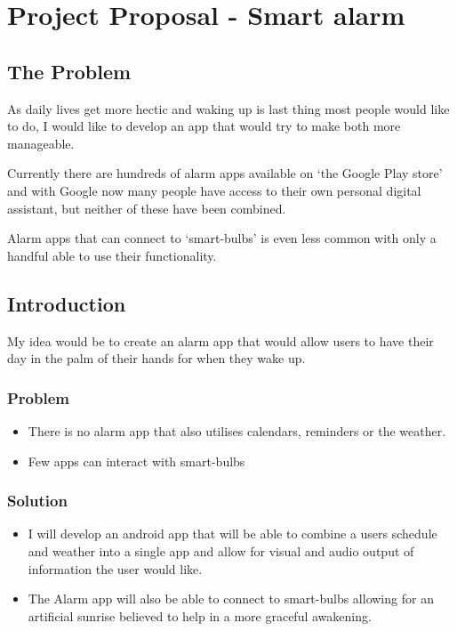 \section{Project Proposal - Smart
alarm}\label{project-proposal---smart-alarm}

\subsection{The Problem}\label{the-problem}

As daily lives get more hectic and waking up is last thing most people
would like to do, I would like to develop an app that would try to make
both more manageable.

Currently there are hundreds of alarm apps available on `the Google Play
store' and with Google now many people have access to their own personal
digital assistant, but neither of these have been combined.

Alarm apps that can connect to `smart-bulbs' is even less common with
only a handful able to use their functionality.

\subsection{Introduction}\label{introduction}

My idea would be to create an alarm app that would allow users to have
their day in the palm of their hands for when they wake up.

\subsubsection{Problem}\label{problem}

\begin{itemize}
\item
  There is no alarm app that also utilises calendars, reminders or the
  weather.
\item
  Few apps can interact with smart-bulbs
\end{itemize}

\subsubsection{Solution}\label{solution}

\begin{itemize}
\item
  I will develop an android app that will be able to combine a users
  schedule and weather into a single app and allow for visual and audio
  output of information the user would like.
\item
  The Alarm app will also be able to connect to smart-bulbs allowing for
  an artificial sunrise believed to help in a more graceful awakening.
\end{itemize}

